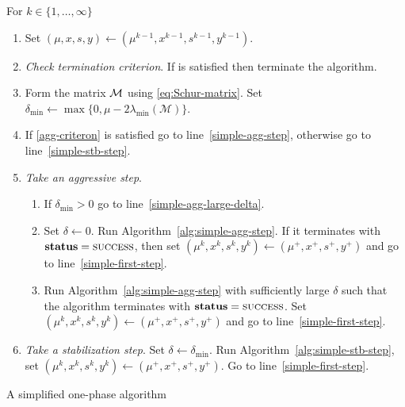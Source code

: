 \documentclass{article}
\begin{document}
\begin{algorithm}[H]
For $k \in \{1, \dots, \infty\}$
\begin{enumerate}[label*=A.{\arabic*}]
\item \label{simple-first-step} Set $(\mu,x,s,y) \gets (\mu^{k-1},x^{k-1},s^{k-1},y^{k-1})$.
\item \emph{Check termination criterion}. If \termination{} is satisfied then terminate the algorithm.
\item \label{alg-simple-delta-min} Form the matrix $\mathcal{M}$ using \eqref{eq:Schur-matrix}. Set $\delta_{\min} \gets \max\{0, \mu-2 \lambda_{\min}(\mathcal{M}) \}$.
\item If \eqref{agg-criteron}  is satisfied go to line~\ref{simple-agg-step},   otherwise go to line~\ref{simple-stb-step}.
\item\label{simple-agg-step} \emph{Take an aggressive step}. 
\begin{enumerate}[label*=.{\arabic*}]
\item If $\delta_{\min} > 0$ go to line~\ref{simple-agg-large-delta}.
\item Set $\delta \gets 0$. Run Algorithm~\ref{alg:simple-agg-step}. If it terminates with $\textbf{status} = \textsc{success}$, then set $(\mu^k,x^k,s^k,y^k) \gets (\mu^{+},x^{+},s^{+},y^{+})$ and go to line~\ref{simple-first-step}.
\item \label{simple-agg-large-delta} Run Algorithm~\ref{alg:simple-agg-step} with sufficiently large $\delta$ such that the algorithm terminates with $\textbf{status} = \textsc{success}$.  Set $(\mu^k,x^k,s^k,y^k) \gets (\mu^{+},x^{+},s^{+},y^{+})$ and go to line~\ref{simple-first-step}.
\end{enumerate}
\item \label{simple-stb-step} \emph{Take a stabilization step}.  Set $\delta \gets \delta_{\min}$. Run Algorithm~\ref{alg:simple-stb-step}, set $(\mu^k,x^k,s^k,y^k) \gets (\mu^{+},x^{+},s^{+},y^{+})$. Go to line~\ref{simple-first-step}.
\end{enumerate}
\caption{A simplified one-phase algorithm}\label{simple-one-phase}
\end{algorithm}
\end{document}
